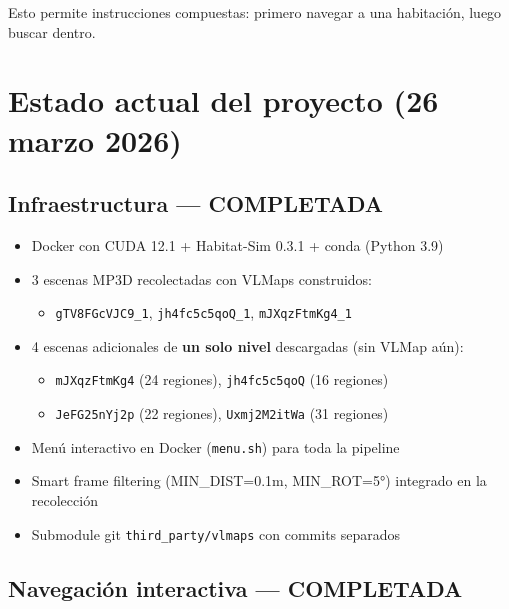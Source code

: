 \documentclass[11pt,a4paper]{article}
\begin{document}
Esto permite instrucciones compuestas: primero navegar a una habitación, luego buscar dentro.

\section{Estado actual del proyecto (26 marzo 2026)}

\subsection{Infraestructura --- COMPLETADA}

\begin{itemize}[leftmargin=2cm]
    \item[\textcolor{done}{$\checkmark$}] Docker con CUDA 12.1 + Habitat-Sim 0.3.1 + conda (Python 3.9)
    \item[\textcolor{done}{$\checkmark$}] 3 escenas MP3D recolectadas con VLMaps construidos:
    \begin{itemize}
        \item \texttt{gTV8FGcVJC9\_1}, \texttt{jh4fc5c5qoQ\_1}, \texttt{mJXqzFtmKg4\_1}
    \end{itemize}
    \item[\textcolor{done}{$\checkmark$}] 4 escenas adicionales de \textbf{un solo nivel} descargadas (sin VLMap aún):
    \begin{itemize}
        \item \texttt{mJXqzFtmKg4} (24 regiones), \texttt{jh4fc5c5qoQ} (16 regiones)
        \item \texttt{JeFG25nYj2p} (22 regiones), \texttt{Uxmj2M2itWa} (31 regiones)
    \end{itemize}
    \item[\textcolor{done}{$\checkmark$}] Menú interactivo en Docker (\texttt{menu.sh}) para toda la pipeline
    \item[\textcolor{done}{$\checkmark$}] Smart frame filtering (MIN\_DIST=0.1m, MIN\_ROT=5°) integrado en la recolección
    \item[\textcolor{done}{$\checkmark$}] Submodule git \texttt{third\_party/vlmaps} con commits separados
\end{itemize}

\subsection{Navegación interactiva --- COMPLETADA}
\end{document}
